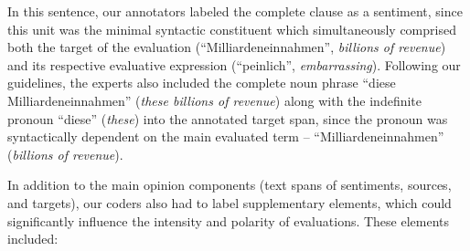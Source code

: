 In this sentence, our annotators labeled the complete clause as a
sentiment, since this unit was the minimal syntactic constituent which
simultaneously comprised both the target of the evaluation
(``Milliardeneinnahmen'', \emph{billions of revenue}) and its
respective evaluative expression (``peinlich'', \emph{embarrassing}).
Following our guidelines, the experts also included the complete noun
phrase ``diese Milliardeneinnahmen'' (\emph{these billions of
  revenue}) along with the indefinite pronoun ``diese'' (\emph{these})
into the annotated target span, since the pronoun was syntactically
dependent on the main evaluated term -- ``Milliardeneinnahmen''
(\emph{billions of revenue}).

In addition to the main opinion components (text spans of sentiments,
sources, and targets), our coders also had to label supplementary
elements, which could significantly influence the intensity and
polarity of evaluations.  These elements included:

